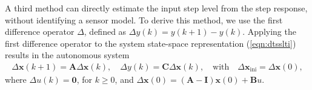 A third method can directly estimate the input step level from the step response, without identifying a sensor model.
To derive this method, we use the first difference operator $\Delta$, defined as $\Delta y(k) = y(k + 1) - y(k)$.
Applying the first difference operator to the system state-space representation (\ref{eqn:dtsslti}) results in the autonomous system
\begin{equation} \begin{aligned} \Delta \mathbf{x}(k+1) = \mathbf{A} \Delta \mathbf{x}(k), \quad \Delta {y}(k) = \mathbf{C} \Delta \mathbf{x}(k), \quad \text{with} \quad \Delta \mathbf{x}_{\text{ini}} = \Delta \mathbf{x}(0) , \label{eqn:ssalti} \end{aligned} \end{equation}
where $\Delta {u}(k) = \mathbf{0}$, for $k \geq 0$, and
$\Delta \mathbf{x}(0) = (\mathbf{A} - \mathbf{I}) \mathbf{x}(0) + \mathbf{B} {{u}}$.

